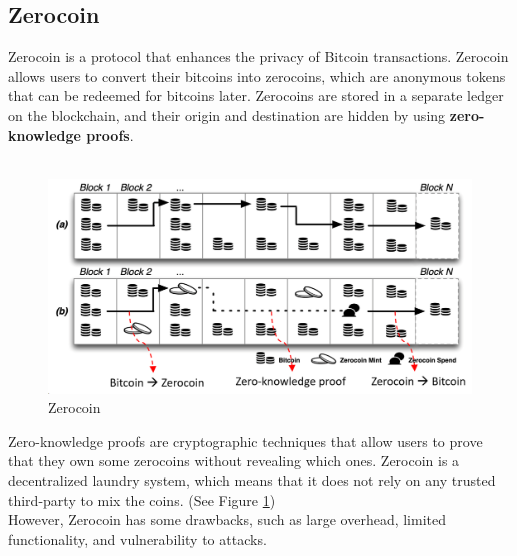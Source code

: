 \subsection{Zerocoin}
Zerocoin is a protocol that enhances the privacy of Bitcoin transactions. Zerocoin allows users to convert their bitcoins into zerocoins, which are anonymous tokens that can be redeemed for bitcoins later. Zerocoins are stored in a separate ledger on the blockchain, and their origin and destination are hidden by using \textbf{zero-knowledge proofs}.\\\\
\begin{figure}[h!]
	\centering
	\includegraphics[width=0.6\linewidth]{Fig/19/F4}
	\caption{Zerocoin}
	\label{fig:L19_f4}
\end{figure}
Zero-knowledge proofs are cryptographic techniques that allow users to prove that they own some zerocoins without revealing which ones. Zerocoin is a decentralized laundry system, which means that it does not rely on any trusted third-party to mix the coins. (See Figure \ref{fig:L19_f4})\\
However, Zerocoin has some drawbacks, such as large overhead, limited functionality, and vulnerability to attacks.

